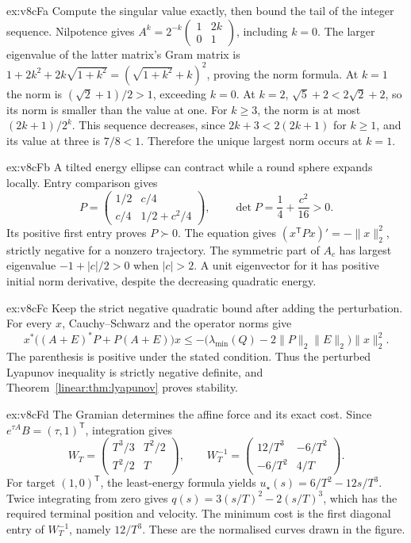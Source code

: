 \begin{solution}{ex:v8cFa}
\idea Compute the singular value exactly, then bound the tail of the integer sequence.
\writeup Nilpotence gives $A^k=2^{-k}\left(\begin{smallmatrix}1&2k\\0&1\end{smallmatrix}\right)$, including $k=0$. The larger eigenvalue of the latter matrix's Gram matrix is $1+2k^2+2k\sqrt{1+k^2}=(\sqrt{1+k^2}+k)^2$, proving the norm formula. At $k=1$ the norm is $(\sqrt2+1)/2>1$, exceeding $k=0$. At $k=2$, $\sqrt5+2<2\sqrt2+2$, so its norm is smaller than the value at one. For $k\ge3$, the norm is at most $(2k+1)/2^k$. This sequence decreases, since $2k+3<2(2k+1)$ for $k\ge1$, and its value at three is $7/8<1$. Therefore the unique largest norm occurs at $k=1$.
\end{solution}
\begin{solution}{ex:v8cFb}
\idea A tilted energy ellipse can contract while a round sphere expands locally.
\writeup Entry comparison gives
\[P=\begin{pmatrix}1/2&c/4\\c/4&1/2+c^2/4\end{pmatrix},\qquad \det P=\frac14+\frac{c^2}{16}>0.
\]
Its positive first entry proves $P\succ0$. The equation gives $(x^{\mathsf T}Px)'=-\|x\|_2^2$, strictly negative for a nonzero trajectory. The symmetric part of $A_c$ has largest eigenvalue $-1+|c|/2>0$ when $|c|>2$. A unit eigenvector for it has positive initial norm derivative, despite the decreasing quadratic energy.
\end{solution}
\begin{solution}{ex:v8cFc}
\idea Keep the strict negative quadratic bound after adding the perturbation.
\writeup For every $x$, Cauchy--Schwarz and the operator norms give
\[x^*\bigl((A+E)^*P+P(A+E)\bigr)x\le-\bigl(\lambda_{\min}(Q)-2\|P\|_2\|E\|_2\bigr)\|x\|_2^2.
\]
The parenthesis is positive under the stated condition. Thus the perturbed Lyapunov inequality is strictly negative definite, and Theorem~\ref{linear:thm:lyapunov} proves stability.
\end{solution}
\begin{solution}{ex:v8cFd}
\idea The Gramian determines the affine force and its exact cost.
\writeup Since $e^{\tau A}B=(\tau,1)^{\mathsf T}$, integration gives
\[W_T=\begin{pmatrix}T^3/3&T^2/2\\T^2/2&T\end{pmatrix},\qquad W_T^{-1}=\begin{pmatrix}12/T^3&-6/T^2\\-6/T^2&4/T\end{pmatrix}.
\]
For target $(1,0)^{\mathsf T}$, the least-energy formula yields $u_\star(s)=6/T^2-12s/T^3$. Twice integrating from zero gives $q(s)=3(s/T)^2-2(s/T)^3$, which has the required terminal position and velocity. The minimum cost is the first diagonal entry of $W_T^{-1}$, namely $12/T^3$. These are the normalised curves drawn in the figure.
\end{solution}

